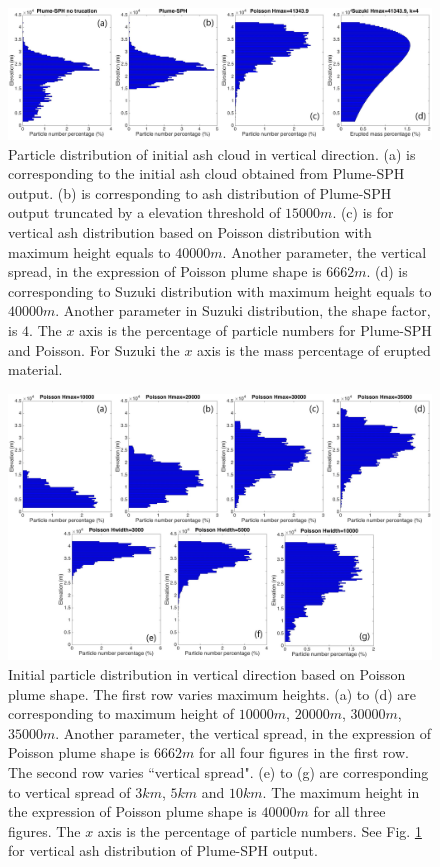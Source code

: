 \documentclass[utf8]{frontiersSCNS} %
\begin{document}
\begin{figure}[!htb]
\centering
\includegraphics[width=1.0\textwidth]{Figures/particle_distribution_vertical_compare}
\caption{Particle distribution of initial ash cloud in vertical direction. (a) is corresponding to the initial ash cloud obtained from Plume-SPH output. (b) is corresponding to ash distribution of Plume-SPH output truncated by a elevation threshold of $15000 m$. (c) is for vertical ash distribution based on Poisson distribution with maximum height equals to $40000 m$. Another parameter, the vertical spread, in the expression of Poisson plume shape is $6662 m$. (d) is corresponding to Suzuki distribution with maximum height equals to $40000 m$. Another parameter in Suzuki distribution, the shape factor, is $4$. The $x$ axis is the percentage of particle numbers for Plume-SPH and Poisson. For Suzuki the $x$ axis is the mass percentage of erupted material.}
\label{fig:Particle-distribution-Plume-SPH-vs-semiempirical}
\end{figure}

\begin{figure}[!htb]
\centering
\includegraphics[width=1.0\textwidth]{Figures/particle_distribution_vertical_calibration}
\caption{Initial particle distribution in vertical direction based on Poisson plume shape. The first row varies maximum heights. (a) to (d) are corresponding to maximum height of $10000 m$, $20000 m$, $30000 m$, $35000 m$. Another parameter, the vertical spread, in the expression of Poisson plume shape is $6662 m$ for all four figures in the first row. The second row varies ``vertical spread". (e) to (g) are corresponding to vertical spread of $3km$, $5km$ and $10 km$. The maximum height in the expression of Poisson plume shape is $40000 m$ for all three figures. The $x$ axis is the percentage of particle numbers. See Fig. \ref{fig:Particle-distribution-Plume-SPH-vs-semiempirical} for vertical ash distribution of Plume-SPH output.}
\label{fig:Particle-distribution-Plume-calibrate-semiempirical}
\end{figure}
\end{document}
